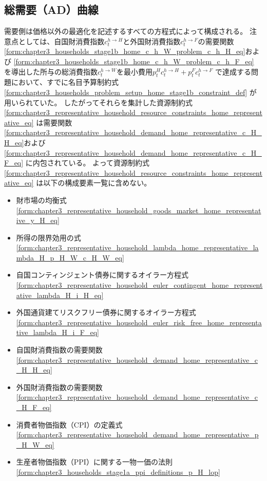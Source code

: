 
\subsection{総需要（AD）曲線}
\label{sec:chapter5_asad_ad}
需要側は価格以外の最適化を記述するすべての方程式によって構成される。
注意点としては、自国財消費指数\(c_t^{h\to H}\)と外国財消費指数\(c_t^{h\to F}\)の需要関数
\eqref{form:chapter3_households_stage1b_home_c_h_W_problem_c_h_H_eq}および
\eqref{form:chapter3_households_stage1b_home_c_h_W_problem_c_h_F_eq}
を導出した所与の総消費指数\(c_t^{h\to W}\)を最小費用\(p_t^Hc_t^{h\to H}+p_t^Fc_t^{h\to F}\)
で達成する問題において、すでに名目予算制約式
\eqref{form:chapter3_households_problem_setup_home_stage1b_constraint_def}
が用いられていた。
したがってそれらを集計した資源制約式
\eqref{form:chapter3_representative_household_resource_constraints_home_representative_eq}
は需要関数
\eqref{form:chapter3_representative_household_demand_home_representative_c_H_H_eq}および
\eqref{form:chapter3_representative_household_demand_home_representative_c_H_F_eq}
に内包されている。
よって資源制約式
\eqref{form:chapter3_representative_household_resource_constraints_home_representative_eq}
は以下の構成要素一覧に含めない。
\begin{itemize}
    \item 財市場の均衡式\eqref{form:chapter3_representative_household_goods_market_home_representative_y_H_eq}
    \item 所得の限界効用の式\eqref{form:chapter3_representative_household_lambda_home_representative_lambda_H_p_H_W_c_H_W_eq}
    \item 自国コンティンジェント債券に関するオイラー方程式\eqref{form:chapter3_representative_household_euler_contingent_home_representative_lambda_H_i_H_eq}
    \item 外国通貨建てリスクフリー債券に関するオイラー方程式\eqref{form:chapter3_representative_household_euler_risk_free_home_representative_lambda_H_i_F_eq}
    \item 自国財消費指数の需要関数\eqref{form:chapter3_representative_household_demand_home_representative_c_H_H_eq}
    \item 外国財消費指数の需要関数\eqref{form:chapter3_representative_household_demand_home_representative_c_H_F_eq}
    \item 消費者物価指数（CPI）の定義式\eqref{form:chapter3_representative_household_demand_home_representative_p_H_W_eq}
    \item 生産者物価指数（PPI）に関する一物一価の法則\eqref{form:chapter3_households_stage1a_ppi_definitions_p_H_lop}
\end{itemize}
